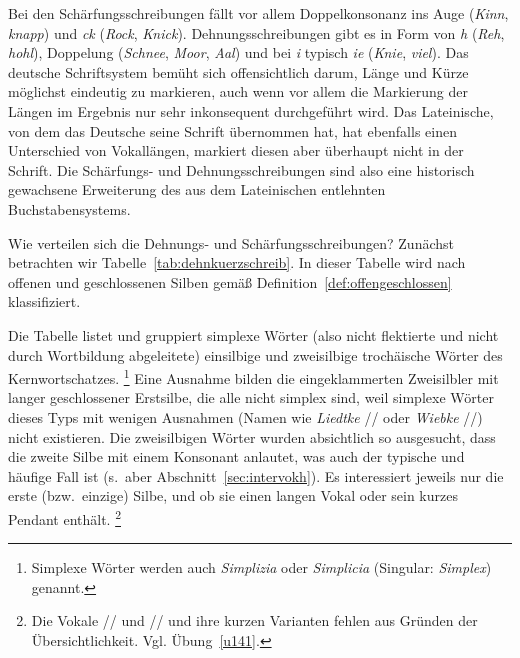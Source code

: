 

Bei den Schärfungsschreibungen fällt vor allem Doppelkonsonanz ins Auge (\textit{Kinn}, \textit{knapp}) und \textit{ck} (\textit{Rock}, \textit{Knick}).
Dehnungsschreibungen gibt es in Form von \textit{h} (\textit{Reh}, \textit{hohl}), Doppelung (\textit{Schnee}, \textit{Moor}, \textit{Aal}) und bei \textit{i} typisch \textit{ie} (\textit{Knie}, \textit{viel}).
Das deutsche Schriftsystem bemüht sich offensichtlich darum, Länge und Kürze möglichst eindeutig zu markieren, auch wenn vor allem die Markierung der Längen im Ergebnis nur sehr inkonsequent durchgeführt wird.
Das Lateinische, von dem das Deutsche seine Schrift übernommen hat, hat ebenfalls einen Unterschied von Vokallängen, markiert diesen aber überhaupt nicht in der Schrift.
Die Schärfungs- und Dehnungsschreibungen sind also eine historisch gewachsene Erweiterung des aus dem Lateinischen entlehnten Buchstabensystems.

Wie verteilen sich die Dehnungs- und Schärfungsschreibungen?
Zunächst betrachten wir Tabelle~\ref{tab:dehnkuerzschreib}.
In dieser Tabelle wird nach offenen und geschlossenen Silben gemäß Definition~\ref{def:offengeschlossen} klassifiziert.


Die Tabelle listet und gruppiert simplexe Wörter (also nicht flektierte und nicht durch Wortbildung abgeleitete) einsilbige und zweisilbige trochäische Wörter des Kernwortschatzes.%
\footnote{Simplexe Wörter werden auch \textit{Simplizia} oder \textit{Simplicia} (Singular: \textit{Simplex}) genannt.}
Eine Ausnahme bilden die eingeklammerten Zweisilbler mit langer geschlossener Erstsilbe, die alle nicht simplex sind, weil simplexe Wörter dieses Typs mit wenigen Ausnahmen (\zB Namen wie \textit{Liedtke} // oder \textit{Wiebke} //) nicht existieren.\label{abs:wiebke}
Die zweisilbigen Wörter wurden absichtlich so ausgesucht, dass die zweite Silbe mit einem Konsonant anlautet, was auch der typische und häufige Fall ist (s.\ aber Abschnitt~\ref{sec:intervokh}).
Es interessiert jeweils nur die erste (bzw.\ einzige) Silbe, und ob sie einen langen Vokal oder sein kurzes Pendant enthält.%
\footnote{Die Vokale /\textipa{\o}/ und // und ihre kurzen Varianten fehlen aus Gründen der Übersichtlichkeit.
Vgl. Übung~\ref{u141}.}

